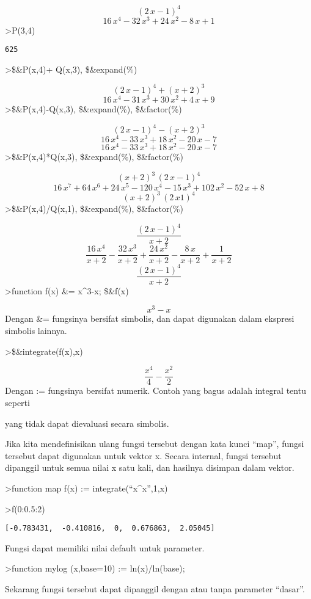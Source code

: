 \documentclass[
]{book}
\begin{document}
\[\left(2\,x-1\right)^4\] \[16\,x^4-32\,x^3+24\,x^2-8\,x+1\]\textgreater P(3,4)

\begin{verbatim}
625
\end{verbatim}

\textgreater\$\&P(x,4)+ Q(x,3), \$\&expand(\%)

\[\left(2\,x-1\right)^4+\left(x+2\right)^3\] \[16\,x^4-31\,x^3+30\,x^2+4\,x+9\]\textgreater\$\&P(x,4)-Q(x,3), \$\&expand(\%), \$\&factor(\%)

\[\left(2\,x-1\right)^4-\left(x+2\right)^3\] \[16\,x^4-33\,x^3+18\,x^2-20\,x-7\] \[16\,x^4-33\,x^3+18\,x^2-20\,x-7\]\textgreater\$\&P(x,4)*Q(x,3), \$\&expand(\%), \$\&factor(\%)

\[\left(x+2\right)^3\,\left(2\,x-1\right)^4\] \[16\,x^7+64\,x^6+24\,x^5-120\,x^4-15\,x^3+102\,x^2-52\,x+8\] \[\left(x+2\right)^3\,\left(2\,x1\right)^4\]\textgreater\$\&P(x,4)/Q(x,1), \$\&expand(\%), \$\&factor(\%)

\[\frac{\left(2\,x-1\right)^4}{x+2}\] \[\frac{16\,x^4}{x+2}-\frac{32\,x^3}{x+2}+\frac{24\,x^2}{x+2}-\frac{8 \,x}{x+2}+\frac{1}{x+2}\] \[\frac{\left(2\,x-1\right)^4}{x+2}\]\textgreater function f(x) \&= x\^{}3-x; \$\&f(x)

\[x^3-x\]Dengan \&= fungsinya bersifat simbolis, dan dapat digunakan dalam ekspresi simbolis lainnya.

\textgreater\$\&integrate(f(x),x)

\[\frac{x^4}{4}-\frac{x^2}{2}\]Dengan := fungsinya bersifat numerik. Contoh yang bagus adalah integral tentu seperti

yang tidak dapat dievaluasi secara simbolis.

Jika kita mendefinisikan ulang fungsi tersebut dengan kata kunci ``map'', fungsi tersebut dapat digunakan untuk vektor x. Secara internal, fungsi tersebut dipanggil untuk semua nilai x satu kali, dan hasilnya disimpan dalam vektor.

\textgreater function map f(x) := integrate(``x\^{}x'',1,x)

\textgreater f(0:0.5:2)

\begin{verbatim}
[-0.783431,  -0.410816,  0,  0.676863,  2.05045]
\end{verbatim}

Fungsi dapat memiliki nilai default untuk parameter.

\textgreater function mylog (x,base=10) := ln(x)/ln(base);

Sekarang fungsi tersebut dapat dipanggil dengan atau tanpa parameter ``dasar''.
\end{document}
